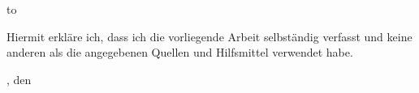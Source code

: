 \thispagestyle{empty}
\vspace*{38\baselineskip}
\hbox to \textwidth{\hrulefill}
\par
Hiermit erkl\"are ich, dass ich die vorliegende Arbeit selbst\"andig verfasst und
keine anderen als die angegebenen Quellen und Hilfsmittel verwendet habe.

\signatureplace, den \signaturedate

\clearpage
